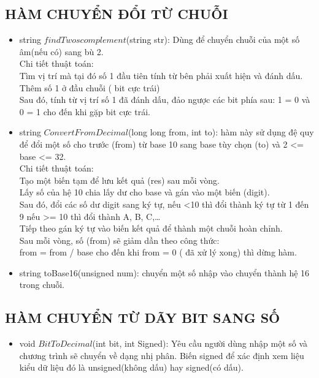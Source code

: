 \documentclass[12pt,a4paper]{article}
\begin{document}
\Large \subsection{\color{blue}\textbf{HÀM CHUYỂN ĐỔI TỪ CHUỖI} }
\begin{itemize}
    \item string $findTwoscomplement$(string str): Dùng để chuyển chuỗi của một số âm(nếu có) sang bù 2.\\
    Chi tiết thuật toán: \\
    Tìm vị trí mà tại đó số 1 đầu tiên tính từ bên phải xuất hiện và đánh dấu.\\
    Thêm số 1 ở đầu chuỗi ( bit cực trái) \\
    Sau đó, tính từ vị trí số 1 đã đánh dấu, đảo ngược các bit phía sau: 1 = 0 và 0 = 1 cho đến khi gặp bit cực trái.\\
    \item string $ConvertFromDecimal$(long long from, int to): hàm này sử dụng đệ quy để đổi một số cho trước (from) từ base 10 sang base tùy chọn (to) và 2 <= base <= 32.  \\
    Chi tiết thuật toán: \\
    Tạo một biến tạm để lưu kết quả (res) sau mỗi vòng. \\
    Lấy số của hệ 10 chia lấy dư cho base và gán vào một biến (digit).\\
    Sau đó, đổi các số dư digit sang ký tự, nếu <10 thì đổi thành ký tự từ 1 đến 9 nếu >= 10 thì đổi thành A, B, C,… \\
    Tiếp theo gán ký tự vào biến kết quả để thành một chuỗi hoàn chỉnh. \\
    Sau mỗi vòng, số (from) sẽ giảm dần theo công thức: \\           
    from = from / base cho đến khi from = 0 ( đã xử lý xong) thì dừng hàm. \\
    \item string toBase16(unsigned num): chuyển một số nhập vào chuyển thành hệ 16 trong chuỗi.\\
\end{itemize}
\Large \subsection{\color{blue}\textbf{HÀM CHUYỂN TỪ DÃY BIT SANG SỐ} }
\begin{itemize}
    \item void $BitToDecimal$(int bit, int Signed): Yêu cầu người dùng nhập một số và chương trình sẽ chuyển về dạng nhị phân. Biến signed để xác định xem liệu kiểu dữ liệu đó là unsigned(không dấu) hay signed(có dấu).\\
\end{itemize}
\end{document}
